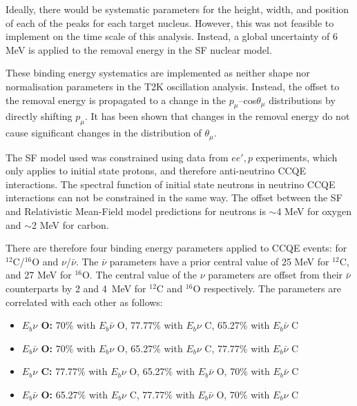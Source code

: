 Ideally, there would be systematic parameters for the height, width, and position of each of the peaks for each target nucleus. However, this was not feasible to implement on the time scale of this analysis. Instead, a global uncertainty of 6 MeV is applied to the removal energy in the SF nuclear model.

These binding energy systematics are implemented as neither shape nor normalisation parameters in the T2K oscillation analysis. Instead, the offset to the removal energy is propagated to a change in the $p_{\mu}$--cos$\theta_{\mu}$ distributions by directly shifting $p_{\mu}$. It has been shown that changes in the removal energy do not cause significant changes in the distribution of $\theta_{\mu}$\cite{tn344}.

The SF model used was constrained using data from $ee',p$ experiments, which only applies to initial state protons, and therefore anti-neutrino CCQE interactions. The spectral function of initial state neutrons in neutrino CCQE interactions can not be constrained in the same way. The offset between the SF and Relativistic Mean-Field model predictions \cite{RMFPred} for neutrons is $\sim$4 MeV for oxygen and $\sim$2 MeV for carbon. 

There are therefore four binding energy parameters applied to CCQE events: for $^{12}$C/$^{16}$O and $\nu$/$\bar{\nu}$. The $\bar{\nu}$ parameters have a prior central value of 25 MeV for $^{12}$C, and 27 MeV for $^{16}$O. The central value of the $\nu$ parameters are offset from their $\bar{\nu}$ counterparts by 2 and 4~MeV for $^{12}$C and $^{16}$O respectively. The parameters are correlated with each other as follows:

\begin{itemize}

\item \textbf{$E_{b}\nu$ O:} 70$\%$ with $E_{b}\bar{\nu}$ O, 77.77$\%$ with $E_{b}\nu$ C, 65.27$\%$ with $E_{b}\bar{\nu}$ C

\item \textbf{$E_{b}\bar{\nu}$ O:} 70$\%$ with $E_{b}\nu$ O, 65.27$\%$ with $E_{b}\nu$ C, 77.77$\%$ with $E_{b}\bar{\nu}$ C

\item \textbf{$E_{b}\nu$ C:} 77.77$\%$ with $E_{b}\nu$ O, 65.27$\%$ with $E_{b}\bar{\nu}$ O, 70$\%$ with $E_{b}\bar{\nu}$ C

\item \textbf{$E_{b}\bar{\nu}$ O:} 65.27$\%$ with $E_{b}\nu$ C, 77.77$\%$ with $E_{b}\bar{\nu}$ O, 70$\%$ with $E_{b}\nu$ C

\end{itemize}

